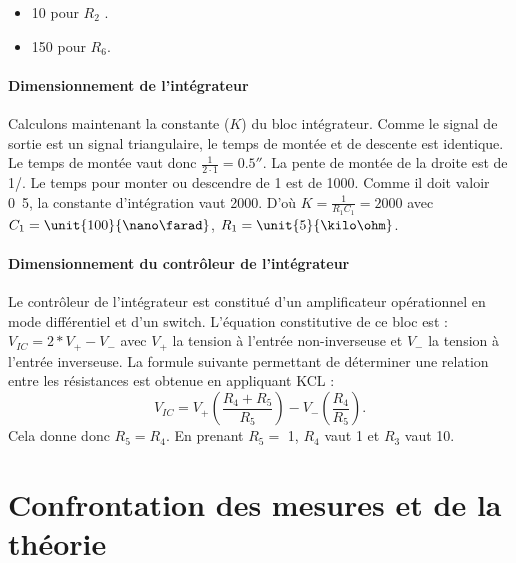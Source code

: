 \begin{itemize}
	\item \unit{10}{\kilo\ohm} pour $R_2$ .
	\item \unit{150}{\kilo\ohm} pour $R_6$.
\end{itemize}

\paragraph{Dimensionnement de l'intégrateur}
Calculons maintenant la constante ($K$) du bloc intégrateur. 
Comme le signal de sortie est un signal triangulaire, le temps de montée et de descente est 
identique. Le temps de montée vaut donc $\frac{1}{2\cdot1} = \unit{0.5}{\second}$. 
La pente de montée de la droite est de \unit{1}{\milli\volt}/\unit{}{\second}. 
Le temps pour monter ou descendre de \unit{1}{\volt} est de \unit{1000}{\second}. 
Comme il doit valoir \unit{0.5}{\second}, la constante d'intégration vaut 2000. D'où 
$K=\frac{1}{R_1C_1} = 2000$ avec $C_1= \unit{100}{\nano\farad}$, $R_1 = \unit{5}{\kilo\ohm}$.
\paragraph{Dimensionnement du contrôleur de l'intégrateur}
Le contrôleur de l'intégrateur est constitué d'un amplificateur opérationnel 
en mode différentiel et d'un switch. L'équation constitutive de ce bloc est : 
$V_{IC}=2*V_+ - V_-$ avec $V_+$ la tension à l'entrée non-inverseuse et $V_-$
la tension à l'entrée inverseuse. La formule suivante permettant de déterminer
une relation entre les résistances est obtenue en appliquant KCL : 
\[ V_{IC}=V_+ \left(\frac{R_4 + R_5}{R_5}\right)-V_-\left(\frac{R_4}{R_5}\right). \] 
Cela donne donc $R_5 = R_4$. En prenant $R_5 =$ \unit{1}{\kilo\ohm}, $R_4$ vaut \unit{1}{\kilo\ohm}
et $R_3$ vaut \unit{10}{\kilo\ohm}.

\section{Confrontation  des mesures et de la théorie}
%

